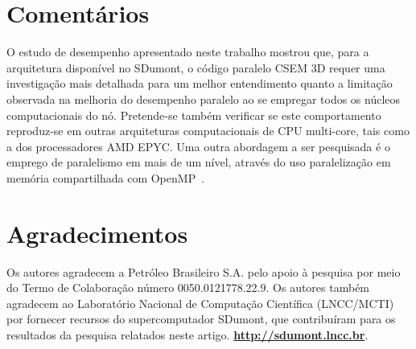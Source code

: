\documentclass[12pt]{article}
\begin{document}
\section{Comentários}
O estudo de desempenho apresentado neste trabalho mostrou que, para a arquitetura disponível no SDumont, o código paralelo CSEM 3D requer uma investigação mais detalhada para um melhor entendimento quanto a limitação observada na melhoria do desempenho paralelo ao se empregar todos os núcleos computacionais do nó. Pretende-se também verificar se este comportamento reproduz-se em outras arquiteturas computacionais de CPU multi-core, tais como a dos processadores AMD EPYC\texttrademark. Uma outra abordagem a ser pesquisada é o emprego de paralelismo em mais de um nível, através do uso paralelização em memória compartilhada com OpenMP~\cite{OpenMP}.


\section*{Agradecimentos}
Os autores agradecem a Petróleo Brasileiro S.A. pelo apoio à pesquisa por meio do Termo de Colaboração número 0050.0121778.22.9. Os autores também agradecem ao Laboratório Nacional de Computação Científica (LNCC/MCTI) por fornecer recursos do supercomputador SDumont, que contribuíram para os resultados da pesquisa relatados neste artigo. \textbf{\url{http://sdumont.lncc.br}}.



\end{document}
